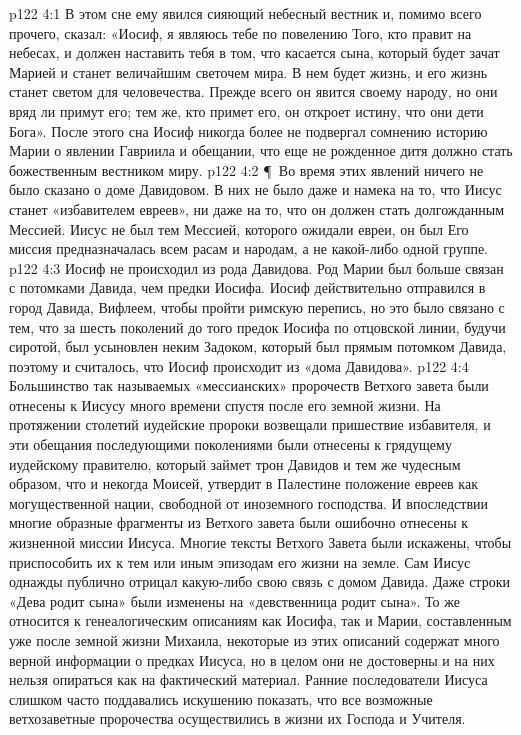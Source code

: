 \vs p122 4:1 В этом сне ему явился сияющий небесный вестник и, помимо всего прочего, сказал: «Иосиф, я являюсь тебе по повелению Того, кто правит на небесах, и должен наставить тебя в том, что касается сына, который будет зачат Марией и станет величайшим светочем мира. В нем будет жизнь, и его жизнь станет светом для человечества. Прежде всего он явится своему народу, но они вряд ли примут его; тем же, кто примет его, он откроет истину, что они дети Бога». После этого сна Иосиф никогда более не подвергал сомнению историю Марии о явлении Гавриила и обещании, что еще не рожденное дитя должно стать божественным вестником миру.
\vs p122 4:2 \P\ Во время этих явлений ничего не было сказано о доме Давидовом. В них не было даже и намека на то, что Иисус станет «избавителем евреев», ни даже на то, что он должен стать долгожданным Мессией. Иисус не был тем Мессией, которого ожидали евреи, он был  Его миссия предназначалась всем расам и народам, а не какой\hyp{}либо одной группе.
\vs p122 4:3 Иосиф не происходил из рода Давидова. Род Марии был больше связан с потомками Давида, чем предки Иосифа. Иосиф действительно отправился в город Давида, Вифлеем, чтобы пройти римскую перепись, но это было связано с тем, что за шесть поколений до того предок Иосифа по отцовской линии, будучи сиротой, был усыновлен неким Задоком, который был прямым потомком Давида, поэтому и считалось, что Иосиф происходит из «дома Давидова».
\vs p122 4:4 Большинство так называемых «мессианских» пророчеств Ветхого завета были отнесены к Иисусу много времени спустя после его земной жизни. На протяжении столетий иудейские пророки возвещали пришествие избавителя, и эти обещания последующими поколениями были отнесены к грядущему иудейскому правителю, который займет трон Давидов и тем же чудесным образом, что и некогда Моисей, утвердит в Палестине положение евреев как могущественной нации, свободной от иноземного господства. И впоследствии многие образные фрагменты из Ветхого завета были ошибочно отнесены к жизненной миссии Иисуса. Многие тексты Ветхого Завета были искажены, чтобы приспособить их к тем или иным эпизодам его жизни на земле. Сам Иисус однажды публично отрицал какую\hyp{}либо свою связь с домом Давида. Даже строки «Дева родит сына» были изменены на «девственница родит сына». То же относится к генеалогическим описаниям как Иосифа, так и Марии, составленным уже после земной жизни Михаила, некоторые из этих описаний содержат много верной информации о предках Иисуса, но в целом они не достоверны и на них нельзя опираться как на фактический материал. Ранние последователи Иисуса слишком часто поддавались искушению показать, что все возможные ветхозаветные пророчества осуществились в жизни их Господа и Учителя.

